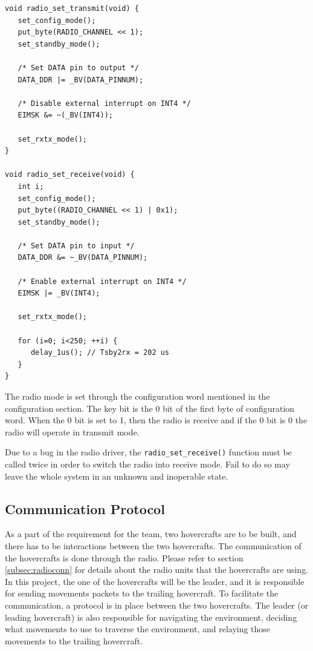 \begin{lstlisting}[float=ht, 
                   caption={Radio Modes}]
void radio_set_transmit(void) {
   set_config_mode();
   put_byte(RADIO_CHANNEL << 1);
   set_standby_mode();

   /* Set DATA pin to output */
   DATA_DDR |= _BV(DATA_PINNUM);

   /* Disable external interrupt on INT4 */
   EIMSK &= ~(_BV(INT4));

   set_rxtx_mode();
} 

void radio_set_receive(void) {
   int i;
   set_config_mode();
   put_byte((RADIO_CHANNEL << 1) | 0x1);
   set_standby_mode();

   /* Set DATA pin to input */
   DATA_DDR &= ~_BV(DATA_PINNUM);

   /* Enable external interrupt on INT4 */
   EIMSK |= _BV(INT4);

   set_rxtx_mode();

   for (i=0; i<250; ++i) {
      delay_1us(); // Tsby2rx = 202 us
   }
}
\end{lstlisting}

The radio mode is set through the configuration word mentioned in the
configuration section. The key bit is the 0 bit of the first byte of
configuration word. When the 0 bit is set to 1, then the radio is receive and if
the 0 bit is 0 the radio will operate in transmit mode.

Due to a bug in the radio driver, the \texttt{radio\_set\_receive()} function
must be called twice in order to switch the radio into receive mode.  Fail to do
so may leave the whole system in an unknown and inoperable state.

\subsection{Communication Protocol}
As a part of the requirement for the team, two hovercrafts are to be built, and
there has to be interactions between the two hovercrafts. The communication of
the hovercrafts is done through the radio. Please refer to section
\ref{subsec:radioconn} for details about the radio units that the hovercrafts
are using. In this project, the one of the hovercrafts will be the leader, and
it is responsible for sending movements packets to the trailing hovercraft. To
facilitate the communication, a protocol is in place between the two
hovercrafts. The leader (or leading hovercraft) is also responsible for
navigating the environment, deciding what movements to use to traverse the
environment, and relaying those movements to the trailing hovercraft.

